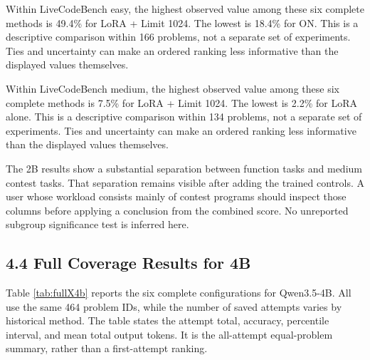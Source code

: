 \documentclass[11pt,letterpaper]{article}
\begin{document}
Within LiveCodeBench easy, the highest observed value among these six complete methods is 49.4\% for LoRA + Limit  1024. The lowest is 18.4\% for ON. This is a descriptive comparison within 166 problems, not a separate set of experiments. Ties and uncertainty can make an ordered ranking less informative than the displayed values themselves.\par

Within LiveCodeBench medium, the highest observed value among these six complete methods is 7.5\% for LoRA + Limit  1024. The lowest is 2.2\% for LoRA alone. This is a descriptive comparison within 134 problems, not a separate set of experiments. Ties and uncertainty can make an ordered ranking less informative than the displayed values themselves.\par

The 2B results show a substantial separation between function tasks and medium contest tasks. That separation remains visible after adding the trained controls. A user whose workload consists mainly of contest programs should inspect those columns before applying a conclusion from the combined score. No unreported subgroup significance test is inferred here.\par

\subsection*{4.4 Full Coverage Results for 4B}

Table \ref{tab:fullX4b} reports the six complete configurations for Qwen3.5-4B. All use the same 464 problem IDs, while the number of saved attempts varies by historical method. The table states the attempt total, accuracy, percentile interval, and mean total output tokens. It is the all-attempt equal-problem summary, rather than a first-attempt ranking.\par
\end{document}
